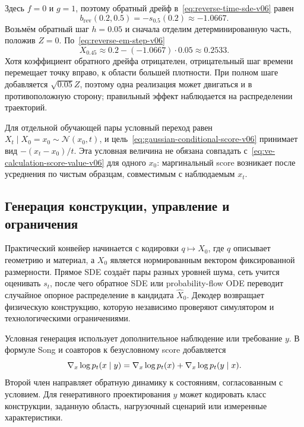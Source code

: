 Здесь $f=0$ и $g=1$, поэтому обратный дрейф в~\eqref{eq:reverse-time-sde-v06} равен
\begin{equation}\label{eq:ve-calculation-reverse-drift-v06}
b_{\mathrm{rev}}(0.2,0.5) = -s_{0.5}(0.2) \approx-1.0667.
\end{equation}
Возьмём обратный шаг $h=0.05$ и сначала отделим детерминированную часть, положив $Z=0$. По~\eqref{eq:reverse-em-step-v06}
\begin{equation}\label{eq:ve-calculation-reverse-step-v06}
X_{0.45} \approx 0.2-(-1.0667)\cdot0.05 \approx 0.2533.
\end{equation}
Хотя коэффициент обратного дрейфа отрицателен, отрицательный шаг времени перемещает точку вправо, к области большей плотности. При полном шаге добавляется $\sqrt{0.05}Z$, поэтому одна реализация может двигаться и в противоположную сторону; правильный эффект наблюдается на распределении траекторий.

Для отдельной обучающей пары условный переход равен $X_t\mid X_0=x_0\sim\mathcal N(x_0,t)$, и цель~\eqref{eq:gaussian-conditional-score-v06} принимает вид $-(x_t-x_0)/t$. Эта условная величина не обязана совпадать с~\eqref{eq:ve-calculation-score-value-v06} для одного $x_0$: маргинальный score возникает после усреднения по чистым образцам, совместимым с наблюдаемым $x_t$.

\subsection{Генерация конструкции, управление и ограничения}

Практический конвейер начинается с кодировки $q\mapsto X_0$, где $q$ описывает геометрию и материал, а $X_0$ является нормированным вектором фиксированной размерности. Прямое SDE создаёт пары разных уровней шума, сеть учится оценивать $s_t$, после чего обратное SDE или probability-flow ODE переводит случайное опорное распределение в кандидата $\widehat X_0$. Декодер возвращает физическую конструкцию, которую независимо проверяют симулятором и технологическими ограничениями.

Условная генерация использует дополнительное наблюдение или требование $y$. В формуле Song и соавторов к безусловному score добавляется
\begin{equation}\label{eq:conditional-score-v06}
\nabla_x\log p_t(x\mid y) = \nabla_x\log p_t(x) + \nabla_x\log p_t(y\mid x).
\end{equation}
Второй член направляет обратную динамику к состояниям, согласованным с условием. Для генеративного проектирования $y$ может кодировать класс конструкции, заданную область, нагрузочный сценарий или измеренные характеристики.

